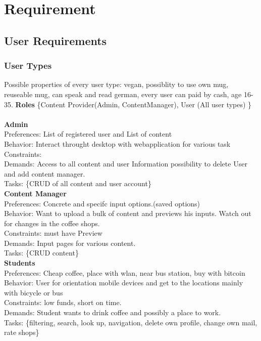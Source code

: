 \section{Requirement}
\subsection{User Requirements}
\subsubsection{User Types}
Possible properties of every user type: vegan, possiblity to use own mug, reuseable mug, can speak and read german, every user can paid by cash, age 16-35.
\textbf{Roles} \{Content Provider(Admin, ContentManager), User (All user types) \}\\\\
\textbf{Admin}\\
Preferences: List of registered user and List of content \\
Behavior: Interact throught desktop with webapplication for various task\\
Constraints: \\
Demands: Access to all content and user Information possibility to delete User and add content manager.\\
Tasks: \{CRUD of all content and user account\}\\
\textbf{Content Manager}\\
Preferences: Concrete and specifc input options.(saved options)\\
Behavior: Want to upload a bulk of content and previews his inputs. Watch out for changes in the coffee shops.\\
Constraints:  must have Preview\\
Demands: Input pages for various content.\\
Tasks: \{CRUD content\}\\
\textbf{Students}\\
Preferences: Cheap coffee, place with wlan, near bus station, buy with bitcoin\\
Behavior: User for orientation mobile devices and get to the locations mainly with bicycle or bus\\
Constraints:  low funds, short on time.\\
Demands: Student wants to drink coffee and possibly a place to work.\\
Tasks: \{filtering, search, look up, navigation, delete own profile, change own mail, rate shops\}\\
